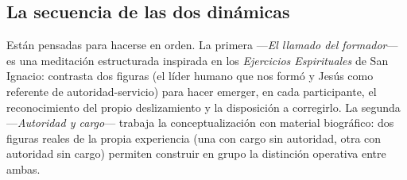 \documentclass[11pt, a4paper]{article}
\begin{document}
\subsection*{La secuencia de las dos dinámicas}

Están pensadas para hacerse en orden. La primera ---\emph{El llamado del formador}--- es una meditación estructurada inspirada en los \emph{Ejercicios Espirituales} de San Ignacio: contrasta dos figuras (el líder humano que nos formó y Jesús como referente de autoridad-servicio) para hacer emerger, en cada participante, el reconocimiento del propio deslizamiento y la disposición a corregirlo. La segunda ---\emph{Autoridad y cargo}--- trabaja la conceptualización con material biográfico: dos figuras reales de la propia experiencia (una con cargo sin autoridad, otra con autoridad sin cargo) permiten construir en grupo la distinción operativa entre ambas.

\vspace{1.5em}
\end{document}
